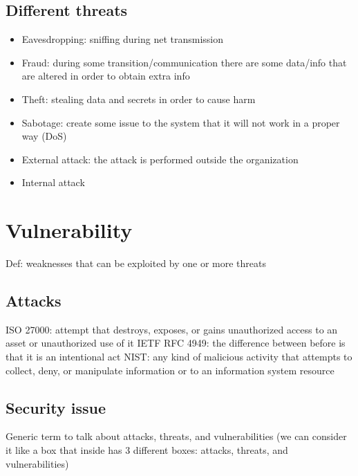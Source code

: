 \documentclass{article}
\begin{document}
\subsection{Different threats}
\begin{itemize}
  \item Eavesdropping: sniffing during net transmission
  \item Fraud: during some transition/communication there are some data/info that are altered in order to obtain extra info
  \item Theft: stealing data and secrets in order to cause harm
  \item Sabotage: create some issue to the system that it will not work in a proper way (DoS)
  \item External attack: the attack is performed outside the organization
  \item Internal attack
\end{itemize}

\section{Vulnerability}
Def: weaknesses that can be exploited by one or more threats

\subsection{Attacks}
ISO 27000: attempt that destroys, exposes, or gains unauthorized access to an asset or unauthorized use of it
IETF RFC 4949: the difference between before is that it is an intentional act
NIST: any kind of malicious activity that attempts to collect, deny, or manipulate information or to an information system resource

\subsection{Security issue}
Generic term to talk about attacks, threats, and vulnerabilities (we can consider it like a box that inside has 3 different boxes: attacks, threats, and vulnerabilities)
\end{document}

